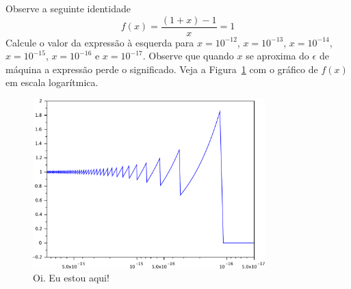 \begin{ex}Observe a seguinte identidade
$$
f(x)=\frac{(1+x)-1}{x}=1
$$
Calcule o valor da expressão à esquerda para $x=10^{-12}$, $x=10^{-13}$, $x=10^{-14}$, $x=10^{-15}$, $x=10^{-16}$ e $x=10^{-17}$. Observe que quando $x$ se aproxima do $\epsilon$ de máquina a expressão perde o significado. Veja a Figura~\ref{fig:cancelamento_0} com o gráfico de $f(x)$ em escala logarítmica.

\begin{figure}
  \centering
  \includegraphics[width=0.8\textwidth]{./cap_aritmetica/pics/cancelamento_0}  
  \caption{Oi. Eu estou aqui!}
  \label{fig:cancelamento_0}
\end{figure}

\end{ex}

